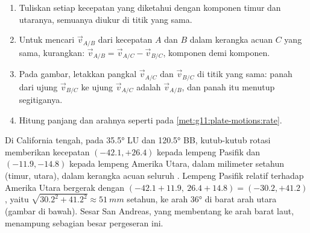 \begin{method}\label{met:g11:plate-motions:triangle}
\begin{enumerate}
  \item Tuliskan setiap kecepatan yang diketahui dengan komponen timur dan
        utaranya, semuanya diukur di titik yang sama.
  \item Untuk mencari $\vec v_{A/B}$ dari kecepatan $A$ dan $B$ dalam kerangka
        acuan $C$ yang sama, kurangkan: $\vec v_{A/B} = \vec v_{A/C} - \vec v_{B/C}$,
        komponen demi komponen.
  \item Pada gambar, letakkan pangkal $\vec v_{A/C}$ dan $\vec v_{B/C}$ di
        titik yang sama: panah dari ujung $\vec v_{B/C}$ ke ujung
        $\vec v_{A/C}$ adalah $\vec v_{A/B}$, dan panah itu menutup segitiganya.
  \item Hitung panjang dan arahnya seperti pada
        \cref{met:g11:plate-motions:rate}.
\end{enumerate}
\end{method}

\begin{example}\label{ex:g11:plate-motions:san-andreas}
Di California tengah, pada \ang{35.5} LU dan \ang{120.5} BB, kutub-kutub
rotasi memberikan kecepatan $(-42.1, +26.4)$ kepada lempeng Pasifik dan
$(-11.9, -14.8)$ kepada lempeng Amerika Utara, dalam milimeter setahun (timur,
utara), dalam kerangka acuan seluruh . Lempeng Pasifik relatif terhadap
Amerika Utara bergerak dengan $(-42.1 + 11.9,\ 26.4 + 14.8) = (-30.2, +41.2)$,
yaitu $\sqrt{30.2^2 + 41.2^2} \approx \qty{51}{mm}$ setahun, ke arah
\ang{36} di barat arah utara (gambar di bawah). Sesar San
Andreas, yang membentang ke arah barat laut, menampung sebagian besar
pergeseran ini.
\end{example}

